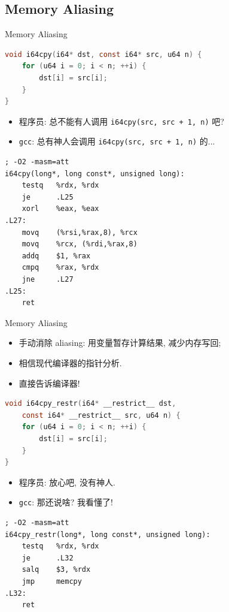 ﻿\documentclass{ctexbeamer}
\begin{document}
\subsection{Memory Aliasing}

\begin{frame}[fragile,shrink=5]{Memory Aliasing}
  \begin{lstlisting}[language=C]
void i64cpy(i64* dst, const i64* src, u64 n) {
    for (u64 i = 0; i < n; ++i) {
        dst[i] = src[i];
    }
}
  \end{lstlisting}

  \begin{itemize}
    \item 程序员: 总不能有人调用 \texttt{i64cpy(src, src + 1, n)} 吧?
    \pause
    \item \texttt{gcc}: 总有神人会调用 \texttt{i64cpy(src, src + 1, n)} 的...
  \end{itemize}

  \begin{lstlisting}[language=x86_64]
; -O2 -masm=att
i64cpy(long*, long const*, unsigned long):
    testq   %rdx, %rdx
    je      .L25
    xorl    %eax, %eax
.L27:
    movq    (%rsi,%rax,8), %rcx
    movq    %rcx, (%rdi,%rax,8)
    addq    $1, %rax
    cmpq    %rax, %rdx
    jne     .L27
.L25:
    ret
  \end{lstlisting}
\end{frame}

\begin{frame}[fragile,shrink=5]{Memory Aliasing}
  \begin{itemize}
    \item 手动消除 aliasing: 用变量暂存计算结果, 减少内存写回;
    \item 相信现代编译器的指针分析.
    \pause
    \item 直接告诉编译器!
  \end{itemize}

  \begin{lstlisting}[language=C]
void i64cpy_restr(i64* __restrict__ dst,
    const i64* __restrict__ src, u64 n) {
    for (u64 i = 0; i < n; ++i) {
        dst[i] = src[i];
    }
}
  \end{lstlisting}

  \begin{itemize}
    \item 程序员: 放心吧, 没有神人.
    \pause
    \item \texttt{gcc}: 那还说啥? 我看懂了!
  \end{itemize}

  \begin{lstlisting}[language=x86_64]
; -O2 -masm=att
i64cpy_restr(long*, long const*, unsigned long):
    testq   %rdx, %rdx
    je      .L32
    salq    $3, %rdx
    jmp     memcpy
.L32:
    ret
  \end{lstlisting}
\end{frame}
\end{document}
